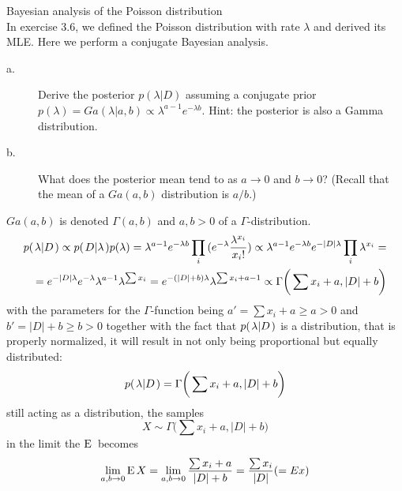 \documentclass[a4paper,twoside=false,abstract=false,numbers=noenddot,
titlepage=false,headings=small,parskip=half,version=last]{scrartcl}
\begin{document}
\begin{exercise}{3.7} Bayesian analysis of the Poisson distribution \\
    In exercise 3.6, we defined the Poisson distribution with rate $\lambda$
    and derived its MLE. Here we perform a conjugate Bayesian analysis. 
    \begin{description}
        \item[a.] Derive the posterior $p(\lambda|D)$ assuming a conjugate
            prior $p(\lambda)=Ga(\lambda|a,b)\propto
            \lambda^{a-1}e^{-\lambda b}$. Hint: the posterior is also a Gamma
            distribution. 
        \item[b.] What does the posterior mean tend to as $a\rightarrow 0$ and
            $b\rightarrow 0$? (Recall that the mean of a $Ga(a,b)$ distribution
            is $a/b$.)
    \end{description}
\end{exercise}
\begin{solution}
    $Ga(a,b)$ is denoted $\Gamma(a,b)$ and $a,b>0$ of a $\Gamma$-distribution.
    \begin{equation}
        \begin{split}
            p{(\left. \lambda \middle\vert D \right.)}\propto
            p{(\left. D \middle\vert \lambda \right.)}p(\lambda)=\lambda^{a-1}e^{-\lambda
            b}\prod\limits_i{(e^{-{\lambda}}\frac{{\lambda}^{x_i}}{{x_i}!})}\propto
            \lambda^{a-1}e^{-\lambda
            b}e^{-|D|\lambda}\prod\limits_i{\lambda^{x_i}}= \\
            =e^{-|D|\lambda}e^{-\lambda}\lambda^{a-1}\lambda^{\sum{x_i}}=
            e^{-(|D|+b)\lambda}\lambda^{\sum{x_i}+a-1}\propto
            \Gamma\bigg(\sum{x_i}+a,|D|+b\bigg)
        \end{split}
    \end{equation}
    with the parameters for the $\Gamma$-function being $a'=\sum x_i + a \ge a > 0$
    and $b' = |D| + b \ge b > 0$ together with the fact that
    $p{(\left. \lambda \middle\vert D \right.)}$ is a distribution, that is properly normalized, it will
    result in not only being proportional but equally distributed:
    \begin{equation}
        p{(\left. \lambda \middle\vert D \right.)}=\Gamma\bigg(\sum{x_i}+a,|D|+b\bigg)
    \end{equation}
    still acting as a distribution, the samples
    \begin{equation}
        X \sim \Gamma\bigg(\sum{x_i}+a,|D|+b\bigg)
    \end{equation}
    in the limit the ${\rm E}\,$ becomes
    \begin{equation}
        \lim_{a,b\rightarrow 0} {\rm E}\, X = \lim_{a,b\rightarrow 0}\frac{\sum
        x_i+a}{|D|+b}=\frac{\sum x_i}{|D|} (=E x)
    \end{equation}
    
\end{solution}

\end{document}
